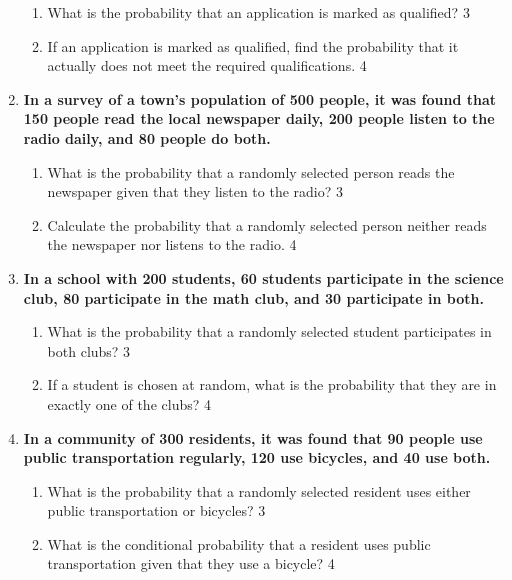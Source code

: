 \documentclass[a4paper,oneside, margin=1.4in]{book}
\begin{document}
\begin{enumerate}
  \begin{enumerate}
   \item  
    What is the probability that an application is marked as qualified? \hfill 3
   \item
    If an application is marked as qualified, find the probability that it actually does not meet the required qualifications. \hfill 4
  \end{enumerate}

\item
  \textbf{In a survey of a town's population of 500 people, it was found that 150 people read the local newspaper daily, 200 people listen to the radio daily, and 80 people do both.}
 
  \begin{enumerate}
    \item
    	What is the probability that a randomly selected person reads the newspaper given that they listen to the radio? \hfill 3
    \item
    	Calculate the probability that a randomly selected person neither reads the newspaper nor listens to the radio. \hfill 4
  \end{enumerate}

\item
  \textbf{In a school with 200 students, 60 students participate in the science 
  club, 80 participate in the math club, and 30 participate in both.}
 
  \begin{enumerate}
    \item
    	What is the probability that a randomly selected student participates in both clubs? \hfill 3
    \item
    	If a student is chosen at random, what is the probability that they are in exactly one of the clubs? \hfill 4
  \end{enumerate}

\item
  \textbf{In a community of 300 residents, it was found that 90 people use public transportation regularly, 120 use bicycles, and 40 use both.}
 
  \begin{enumerate}
    \item
    	What is the probability that a randomly selected resident uses either public transportation or bicycles? \hfill 3
    \item
    	What is the conditional probability that a resident uses public transportation given that they use a bicycle? \hfill 4
  \end{enumerate}


\end{enumerate}
\end{document}
